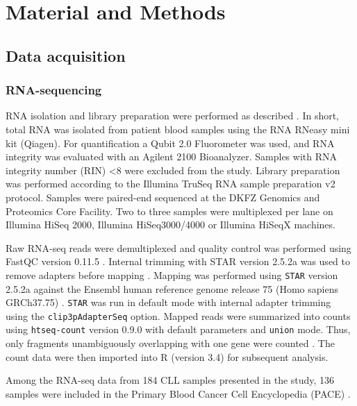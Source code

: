 

\section{Material and Methods}

\subsection{Data acquisition}

\subsubsection{RNA-sequencing}
RNA isolation and library preparation were performed as described \citet{Dietrich}. In short, total RNA was isolated from patient blood samples using the RNA RNeasy mini kit (Qiagen). For quantification a Qubit 2.0 Fluorometer was used, and RNA integrity was evaluated with an Agilent 2100 Bioanalyzer. Samples with RNA integrity number (RIN) <8 were excluded from the study. Library preparation was performed according to the Illumina TruSeq RNA sample preparation v2 protocol. Samples were paired-end sequenced at the DKFZ Genomics and Proteomics Core Facility. Two to three samples were multiplexed per lane on Illumina HiSeq 2000, Illumina HiSeq3000/4000 or Illumina HiSeqX machines.
 

Raw RNA-seq reads were demultiplexed and quality control was performed using FastQC version 0.11.5 \citep{Andrews}. Internal trimming with STAR version 2.5.2a \citep{Dobin2015} was used to remove adapters before mapping \citep{Dobin2015}. Mapping was performed using \texttt{STAR} version 2.5.2a \citep{Dobin2015} against the Ensembl human reference genome release 75 (Homo sapiens GRCh37.75) \citep{Flicek2014}. \texttt{STAR} was run in default mode with internal adapter trimming using the \texttt{clip3pAdapterSeq} option. Mapped reads were summarized into counts using \texttt{htseq-count} version 0.9.0 \citep{Anders2010} with default parameters and \texttt{union} mode. Thus, only fragments unambiguously overlapping with one gene were counted \citep{Anders2010}. The count data were then imported into R (version 3.4) for subsequent analysis. 

Among the RNA-seq data from 184 CLL samples presented in the study, 136 samples were included in the Primary Blood Cancer Cell Encyclopedia (PACE) \citep{Dietrich}.


